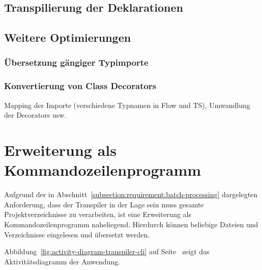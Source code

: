   \subsection{Transpilierung der Deklarationen}

  \subsection{Weitere Optimierungen}
    \subsubsection{Übersetzung gängiger Typimporte}
    \subsubsection{Konvertierung von Class Decorators}

  Mapping der Importe (verschiedene Typnamen in Flow und TS), Umwandlung der Decorators usw.

\section{Erweiterung als Kommandozeilenprogramm}

Aufgrund der in Abschnitt~\ref{subsection:requirement:batch-processing} dargelegten Anforderung, dass der Transpiler in der Lage sein muss gesamte Projektverzeichnisse zu verarbeiten, ist eine Erweiterung als Kommandozeilenprogramm naheliegend. Hierdurch können beliebige Dateien und Verzeichnisse eingelesen und übersetzt werden.


Abbildung~\ref{fig:activity-diagram-transpiler-cli} auf Seite~\pageref{fig:activity-diagram-transpiler-cli} zeigt das Aktivitätsdiagramm der Anwendung.

